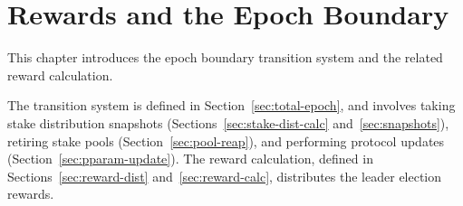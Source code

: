 \section{Rewards and the Epoch Boundary}
\label{sec:epoch}

\newcommand{\UTxOEpState}{\type{UTxOEpState}}
\newcommand{\Acnt}{\type{Acnt}}
\newcommand{\PlReapState}{\type{PlReapState}}
\newcommand{\NewPParamEnv}{\type{NewPParamEnv}}
\newcommand{\Snapshots}{\type{Snapshots}}
\newcommand{\SnapshotEnv}{\type{SnapshotEnv}}
\newcommand{\SnapshotState}{\type{SnapshotState}}
\newcommand{\NewPParamState}{\type{NewPParamState}}
\newcommand{\EpochEnv}{\type{EpochEnv}}
\newcommand{\EpochState}{\type{EpochState}}
\newcommand{\BlocksMade}{\type{BlocksMade}}
\newcommand{\Stake}{\type{Stake}}
\newcommand{\Avgs}{\type{Avgs}}
\newcommand{\RewardUpdate}{\type{RewardUpdate}}

\newcommand{\obligation}[4]{\fun{obligation}~ \var{#1}~ \var{#2}~ \var{#3}~ \var{#4}}
\newcommand{\reward}[8]{\fun{reward}
  ~ \var{#1}~ \var{#2}~ \var{#3}~ \var{#4}~ \var{#5}~ \var{#6}~ \var{#7}~ \var{#8}}
\newcommand{\rewardOnePool}[9]{\fun{rewardOnePool}
  ~\var{#1}~\var{#2}~\var{#3}~\var{#4}~\var{#5}~\var{#6}~\var{#7}~\var{#8}~\var{#9}}
\newcommand{\isActive}[4]{\fun{isActive}~ \var{#1}~ \var{#2}~ \var{#3}~ \var{#4}}
\newcommand{\activeStake}[5]{\fun{activeStake}~ \var{#1}~ \var{#2}~ \var{#3}~ \var{#4}~ \var{#5}}
\newcommand{\poolRefunds}[3]{\fun{poolRefunds}~ \var{#1}~ \var{#2}~ \var{#3}}
\newcommand{\poolStake}[3]{\fun{poolStake}~ \var{#1}~ \var{#2}~ \var{#3}}
\newcommand{\stakeDistr}[3]{\fun{stakeDistr}~ \var{#1}~ \var{#2}~ \var{#3}}
\newcommand{\lReward}[4]{\fun{r_{leader}}~ \var{#1}~ \var{#2}~ \var{#3}~ {#4}}
\newcommand{\mReward}[4]{\fun{r_{member}}~ \var{#1}~ \var{#2}~ \var{#3}~ {#4}}
\newcommand{\poolReward}[6]{\fun{poolReward}~\var{#1}~\var{#2}~\var{#3}~\var{#4}~\var{#5}~\var{#6}}
\newcommand{\movingAvg}[5]{\fun{movingAvg}~ \var{#1}~ \var{#2}~ \var{#3}~ \var{#4}~ \var{#5}}
\newcommand{\updateAvgs}[5]{\fun{updateAvgs}~ \var{#1}~ \var{#2}~ \var{#3}~ \var{#4}~ \var{#5}}
\newcommand{\createRUpd}[2]{\fun{createRUpd}~\var{#1}~\var{#2}}

This chapter introduces the epoch boundary transition system and the related reward calculation.

The transition system is defined in Section~\ref{sec:total-epoch},
and involves taking stake distribution snapshots
(Sections~\ref{sec:stake-dist-calc} and~\ref{sec:snapshots}),
retiring stake pools (Section~\ref{sec:pool-reap}),
and performing protocol updates (Section~\ref{sec:pparam-update}).
The reward calculation, defined in Sections~\ref{sec:reward-dist} and~\ref{sec:reward-calc},
distributes the leader election rewards.


